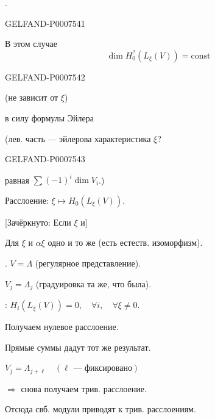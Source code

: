 .


\begin{GelfandAdjacentEvidence}{GELFAND-P000754}{1}

В этом случае
\[
\dim H_0^{?}(L_\xi(V))=\mathrm{const}
\]
\end{GelfandAdjacentEvidence}
\begin{GelfandAdjacentEvidence}{GELFAND-P000754}{2}

(не зависит от \(\xi\))

в силу формулы Эйлера

(лев. часть — эйлерова характеристика \(\xi\)?
\end{GelfandAdjacentEvidence}
\begin{GelfandAdjacentEvidence}{GELFAND-P000754}{3}

равная \(\sum(-1)^i\dim V_i\).)

Расслоение: \(\xi\longmapsto H_0(L_\xi(V))\).

[Зачёркнуто: Если \(\xi\) и]
\end{GelfandAdjacentEvidence}


Для \(\xi\) и \(\alpha\xi\) одно и то же (есть естеств. изоморфизм).

. \(V=\Lambda\) (регулярное представление).

\(V_j=\Lambda_j\) (градуировка та же, что была).

:
\(H_i(L_\xi(V))=0,\quad\forall i,\quad\forall\xi\ne0\).

Получаем нулевое расслоение.

Прямые суммы дадут тот же результат.

\(V_j=\Lambda_{j+\ell}\quad(\ell\text{ --- фиксировано})\)

\(\Rightarrow\) снова получаем трив. расслоение.

Отсюда свб. модули приводят к трив. расслоениям.


